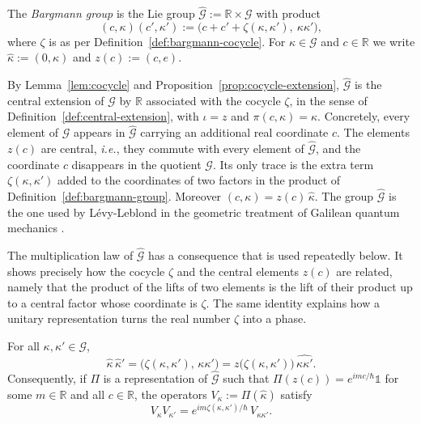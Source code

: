\begin{definition}\label{def:bargmann-group}
	The \emph{Bargmann group} is the Lie group $\widehat{\mathcal{G}}:=\mathbb{R}\times\mathcal{G}$ with product
	\begin{equation}
		(c,\kappa)(c',\kappa') := \big(c+c'+\zeta(\kappa,\kappa'),\ \kappa\kappa'\big),
	\end{equation}
	where $\zeta$ is as per Definition~\ref{def:bargmann-cocycle}. For $\kappa\in\mathcal{G}$ and $c\in\mathbb{R}$ we write $\hat\kappa:=(0,\kappa)$ and $z(c):=(c,e)$.
\end{definition}

\begin{remark}\label{rem:central-extension}
	By Lemma~\ref{lem:cocycle} and Proposition~\ref{prop:cocycle-extension}, $\widehat{\mathcal{G}}$ is the central extension of $\mathcal{G}$ by $\mathbb{R}$ associated with the cocycle $\zeta$, in the sense of Definition~\ref{def:central-extension}, with $\iota=z$ and $\pi(c,\kappa)=\kappa$. Concretely, every element of $\mathcal{G}$ appears in $\widehat{\mathcal{G}}$ carrying an additional real coordinate $c$. The elements $z(c)$ are central, \textit{i.e.}, they commute with every element of $\widehat{\mathcal{G}}$, and the coordinate $c$ disappears in the quotient $\mathcal{G}$. Its only trace is the extra term $\zeta(\kappa,\kappa')$ added to the coordinates of two factors in the product of Definition~\ref{def:bargmann-group}. Moreover $(c,\kappa)=z(c)\,\hat\kappa$. The group $\widehat{\mathcal{G}}$ is the one used by L\'evy-Leblond in the geometric treatment of Galilean quantum mechanics \cite[TODO-location]{TODO-LevyLeblond1971}.
\end{remark}

The multiplication law of $\widehat{\mathcal{G}}$ has a consequence that is used repeatedly below. It shows precisely how the cocycle $\zeta$ and the central elements $z(c)$ are related, namely that the product of the lifts of two elements is the lift of their product up to a central factor whose coordinate is $\zeta$. The same identity explains how a unitary representation turns the real number $\zeta$ into a phase.

\begin{lemma}\label{lem:lift-product}
	For all $\kappa,\kappa'\in\mathcal{G}$,
	\begin{equation*}
		\hat\kappa\,\hat\kappa'=\big(\zeta(\kappa,\kappa'),\,\kappa\kappa'\big)=z\big(\zeta(\kappa,\kappa')\big)\,\widehat{\kappa\kappa'}.
	\end{equation*}
	Consequently, if $\Pi$ is a representation of $\widehat{\mathcal{G}}$ such that $\Pi(z(c))=e^{imc/\hbar}\mathbb{1}$ for some $m\in\mathbb{R}$ and all $c\in\mathbb{R}$, the operators $V_\kappa:=\Pi(\hat\kappa)$ satisfy
	\begin{equation*}
		V_\kappa V_{\kappa'}=e^{im\zeta(\kappa,\kappa')/\hbar}\,V_{\kappa\kappa'}.
	\end{equation*}
\end{lemma}

